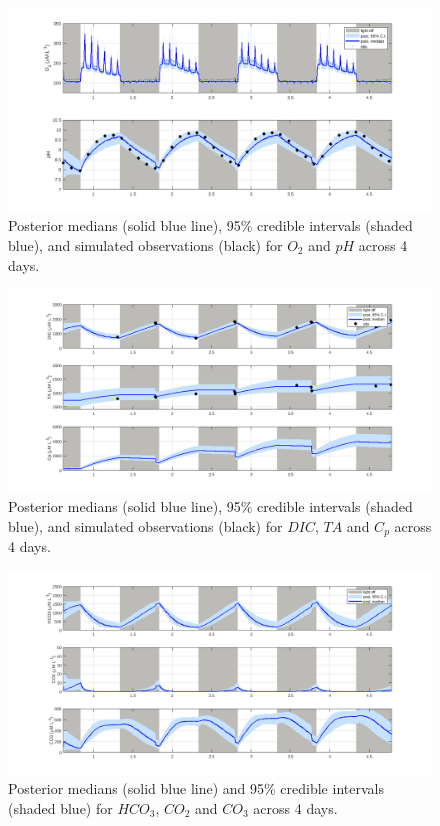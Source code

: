 \documentclass{ruthesis}
\begin{document}
\begin{figure}
	\centerline{\includegraphics[width=1.2\textwidth]{images_microalgae/plots_chris_offset_thinned/O2_pH}}
	\caption[.]{Posterior medians (solid blue line), 95\% credible intervals (shaded blue), and simulated observations (black) for $O_2$ and $pH$ across 4 days.}
	\label{fig:micro_exp_test_O2_pH}
\end{figure}

\begin{figure}
	\centerline{\includegraphics[width=1.2\textwidth]{images_microalgae/plots_chris_offset_thinned/DIC_TA_Cp}}
	\caption[.]{Posterior medians (solid blue line), 95\% credible intervals (shaded blue), and simulated observations (black) for $DIC$, $TA$ and $C_p$ across 4 days.}
	\label{fig:micro_exp_test_DIC_TA_Cp}
\end{figure}

\begin{figure}
	\centerline{\includegraphics[width=1.2\textwidth]{images_microalgae/plots_chris_offset_thinned/carbon}}
	\caption[.]{Posterior medians (solid blue line) and 95\% credible intervals (shaded blue) for $HCO_3$, $CO_2$ and $CO_3$ across 4 days.}
	\label{fig:micro_exp_test_carbon}
\end{figure}
\end{document}
